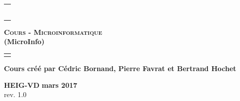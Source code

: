 \documentclass[10pt,a4paper]{book}
\newcommand{\version}{1.0}
\begin{document}

\begin{titlepage}
\begin{tabular}{l}
 \\
 \\
 \\
 \\
 \\
 \\
 \\

\end{tabular}
\begin{center}
\Large\textbf{\textsc{Cours -  Microinformatique} }\\

\Large\textbf{ (MicroInfo)}
\end{center}
\begin{tabular}{c}
 \\
 \\
\end{tabular}
\begin{center}
  \textbf{Cours créé par Cédric Bornand, Pierre Favrat et Bertrand Hochet}
\end{center}
\begin{center}
\textbf{HEIG-VD}
\textbf{mars 2017} \\
 rev. \version
\end{center}
\begin{tabular}{c}
 \\ 
\end{tabular}

 \end{titlepage}
\end{document}
